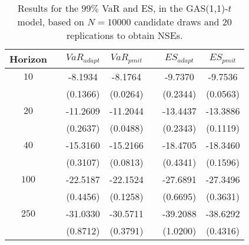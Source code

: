 \begin{table}[h] 
\centering 
\caption{Results for the $99\%$ VaR and ES, in the GAS(1,1)-$t$ model, based on $N=10000$ candidate draws and $20$ replications to obtain NSEs.} 
\label{tab:res_pmit_t_gas} 
\begin{tabular}{ccccccc}  
 Horizon & & $VaR_{adapt}$ & $VaR_{pmit}$ & & $ES_{adapt}$ & $ES_{pmit}$ \\ \hline 
$10$ & & -8.1934 & -8.1764 & & -9.7370 & -9.7536  \\ 
 & & (0.1366) & (0.0264) & & (0.2344) & (0.0563)   \\ [1ex] 
$20$ & & -11.2609 & -11.2044 & & -13.4437 & -13.3886  \\ 
 & & (0.2637) & (0.0488) & & (0.2343) & (0.1119)   \\ [1ex] 
$40$ & & -15.3160 & -15.2166 & & -18.4705 & -18.3460  \\ 
 & & (0.3107) & (0.0813) & & (0.4341) & (0.1596)   \\ [1ex] 
$100$ & & -22.5187 & -22.1524 & & -27.6891 & -27.3496  \\ 
 & & (0.4456) & (0.1258) & & (0.6695) & (0.3631)   \\ [1ex] 
$250$ & & -31.0330 & -30.5711 & & -39.2088 & -38.6292  \\ 
 & & (0.8712) & (0.3791) & & (1.0200) & (0.4316)   \\ [1ex] 
\hline 
\end{tabular} 
\end{table} 

